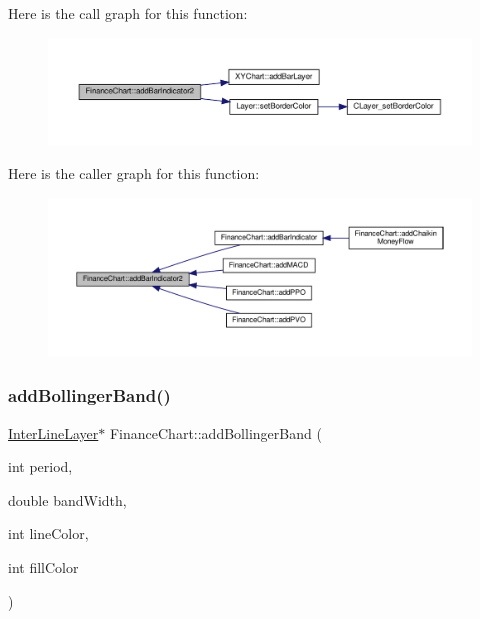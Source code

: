 Here is the call graph for this function\+:
\nopagebreak
\begin{figure}[H]
\begin{center}
\leavevmode
\includegraphics[width=350pt]{class_finance_chart_a0578e0d86422fa48ffc07a54c2216d94_cgraph}
\end{center}
\end{figure}
Here is the caller graph for this function\+:
\nopagebreak
\begin{figure}[H]
\begin{center}
\leavevmode
\includegraphics[width=350pt]{class_finance_chart_a0578e0d86422fa48ffc07a54c2216d94_icgraph}
\end{center}
\end{figure}
\mbox{\label{class_finance_chart_aa1698c472254b430e501324024725cfb}} 
\subsubsection{\texorpdfstring{add\+Bollinger\+Band()}{addBollingerBand()}}
{\footnotesize\ttfamily \hyperlink{class_inter_line_layer}{Inter\+Line\+Layer}$\ast$ Finance\+Chart\+::add\+Bollinger\+Band (\begin{DoxyParamCaption}\item[{int}]{period,  }\item[{double}]{band\+Width,  }\item[{int}]{line\+Color,  }\item[{int}]{fill\+Color }\end{DoxyParamCaption})\hspace{0.3cm}{\ttfamily [inline]}}



